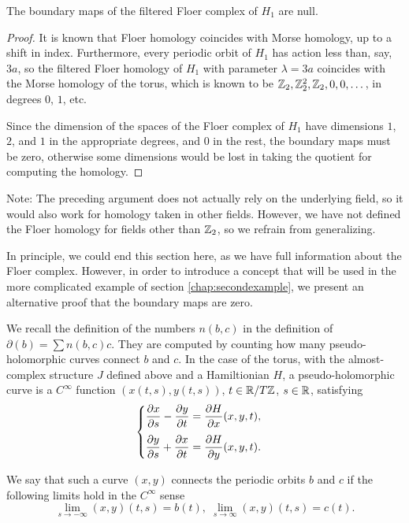 \begin{prop}
The boundary maps of the filtered Floer complex of $H_1$ are null.
\end{prop}

\begin{proof}
It is known that Floer homology coincides with Morse homology, up to a shift in index. Furthermore, every periodic orbit of $H_1$ has action less than, say, $3a$, so the filtered Floer homology of $H_1$ with parameter $\lambda = 3a$ coincides with the Morse homology of the torus, which is known to be $\mathbb{Z}_2, \mathbb{Z}_2^2, \mathbb{Z}_2, 0, 0, \dots$, in degrees $0$, $1$, etc.

Since the dimension of the spaces of the Floer complex of $H_1$ have dimensions $1$, $2$, and $1$ in the appropriate degrees, and 0 in the rest, the boundary maps must be zero, otherwise some dimensions would be lost in taking the quotient for computing the homology.
\end{proof}

Note: The preceding argument does not actually rely on the underlying field, so it would also work for homology taken in other fields. However, we have not defined the Floer homology for fields other than $\mathbb{Z}_2$, so we refrain from generalizing.

In principle, we could end this section here, as we have full information about the Floer complex. However, in order to introduce a concept that will be used in the more complicated example of section \ref{chap:secondexample}, we present an alternative proof that the boundary maps are zero.

We recall the definition of the numbers $n(b,c)$ in the definition of $\partial(b) = \sum n(b,c) c$. They are computed by counting how many pseudo-holomorphic curves connect $b$ and $c$. In the case of the torus, with the almost-complex structure $J$ defined above and a Hamiltionian $H$, a pseudo-holomorphic curve is a $C^\infty$ function $(x(t,s), y(t,s))$, $t \in \mathbb{R} / T\mathbb{Z}$, $s \in \mathbb{R}$, satisfying
\begin{equation}\label{pseudoholomorphic}
\begin{cases}
\displaystyle \diffp x s - \diffp y t = \diffp H x(x,y,t),\\[1em]
\displaystyle \diffp y s + \diffp x t = \diffp H y(x,y,t).
\end{cases}
\end{equation}

We say that such a curve $(x,y)$ connects the periodic orbits $b$ and $c$ if the following limits hold in the $C^\infty$ sense
\begin{equation}
\lim_{s \to -\infty} (x,y)(t,s) = b(t), \; \lim_{s \to \infty} (x,y)(t,s) = c(t).
\end{equation}

